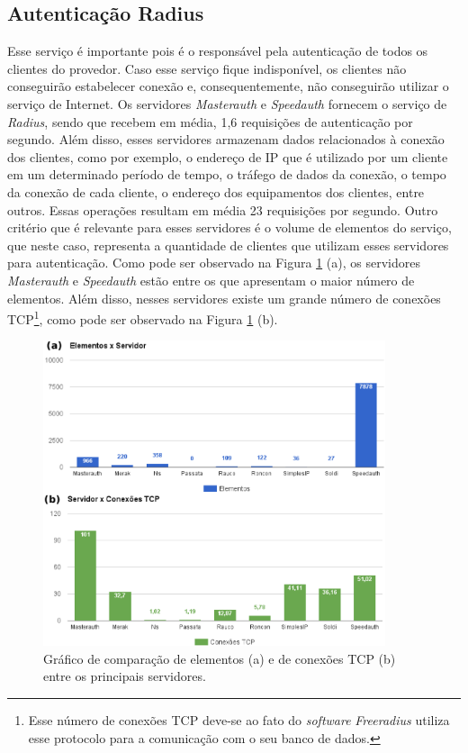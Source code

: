 \subsection{Autenticação Radius}
\label{section:radius}

Esse serviço é importante pois é o responsável pela autenticação de todos os clientes do provedor. Caso esse serviço fique indisponível, 
os clientes não conseguirão estabelecer conexão e, consequentemente, não conseguirão utilizar o serviço de Internet. Os servidores 
\textit{Masterauth} e \textit{Speedauth} fornecem o serviço de \textit{Radius}, sendo que recebem em média, 1,6 requisições de autenticação 
por segundo. Além disso, esses servidores armazenam dados relacionados à conexão dos clientes, como por exemplo, o endereço de \ac{IP} que é 
utilizado por um cliente em um determinado período de tempo, o tráfego de dados da conexão, o tempo da conexão de cada cliente, o endereço 
 dos equipamentos dos clientes, entre outros. Essas operações resultam em média 23 requisições por segundo. 
Outro critério que é relevante para esses servidores é o volume de elementos do serviço, que neste caso, representa a quantidade de clientes que
utilizam esses servidores para autenticação. Como pode ser observado na Figura \ref{fig:elementos_tcp} (a), os servidores \textit{Masterauth} e 
\textit{Speedauth} estão entre os que apresentam o maior número de elementos. Além disso, nesses servidores existe um grande número de conexões 
\ac{TCP}\footnote[1]{Esse número de conexões \ac{TCP} deve-se ao fato do \textit{software} \textit{Freeradius} utiliza esse protocolo para a 
comunicação com o seu banco de dados.}, como pode ser observado na Figura \ref{fig:elementos_tcp} (b).


\begin{figure}[h!]
 \centering
 \includegraphics[width=380px]{img/elementos_tcp.eps}
 \caption{Gráfico de comparação de elementos (a) e de conexões TCP (b) entre os principais servidores.}
 \label{fig:elementos_tcp}
\end{figure}

